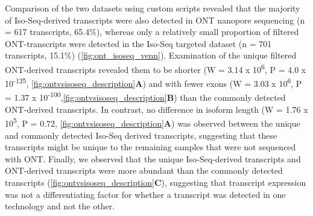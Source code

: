 Comparison of the two datasets using custom scripts revealed that the majority of Iso-Seq-derived transcripts were also detected in ONT nanopore sequencing (n = 617 transcripts, 65.4\%), whereas only a relatively small proportion of filtered ONT-transcripts were detected in the Iso-Seq targeted dataset (n = 701 transcripts, 15.1\%) (\cref{fig:ont_isoseq_venn}). Examination of the unique filtered ONT-derived transcripts revealed them to be shorter (W = 3.14 x 10\textsuperscript{6}, P = 4.0 x 10\textsuperscript{-125}, \cref{fig:ontvsisoseq_description}\textbf{A}) and with fewer exons (W = 3.03 x 10\textsuperscript{6}, P = 1.37 x 10\textsuperscript{-100},\cref{fig:ontvsisoseq_description}\textbf{B}) than the commonly detected ONT-derived transcripts. In contrast, no difference in isoform length (W = 1.76 x 10\textsuperscript{5}, P = 0.72, \cref{fig:ontvsisoseq_description}\textbf{A}) was observed between the unique and commonly detected Iso-Seq derived transcripts, suggesting that these transcripts might be unique to the remaining samples that were not sequenced with ONT. Finally, we observed that the unique Iso-Seq-derived transcripts and ONT-derived transcripts were more abundant than the commonly detected transcripts (\cref{fig:ontvsisoseq_description}\textbf{C}), suggesting that transcript expression was not a differentiating factor for whether a transcript was detected in one technology and not the other. 

